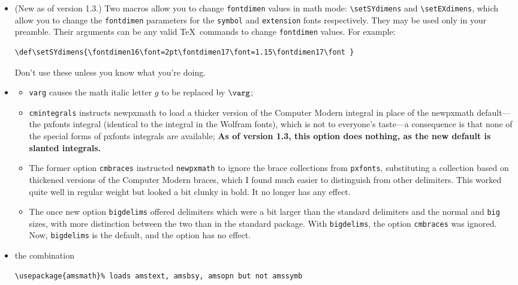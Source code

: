 \documentclass[11pt]{article}
\theoremstyle{oldplain}
\theoremstyle{plain}
\begin{document}
\begin{itemize}
\[\sum \Sumop \textstyle{\sum} \smallsum\]
Similarly, there are \verb|\smallprod| and \verb|\smallcoprod| which, along with \verb|\smallsum|, are of class {\tt mathop}, unlike their Greek letter equivalents.
\item (New as of version 1.3.) Two macros allow you to change {\tt fontdimen} values in math mode: \verb|\setSYdimens| and \verb|\setEXdimens|, which allow you to change the {\tt fontdimen} parameters for the {\tt symbol} and {\tt extension} fonts respectively. They may be used only in your preamble. Their arguments can be any valid \TeX\ commands to change {\tt fontdimen} values. For example:
\begin{verbatim}
\def\setSYdimens{\fontdimen16\font=2pt\fontdimen17\font=1.15\fontdimen17\font }
\end{verbatim}
Don't use these unless you know what you're doing.
\item 
\begin{itemize}
\item{\tt varg} causes the math italic letter $g$ to be replaced by $\varg$;
\item{\tt cmintegrals} instructs \textsf{newpxmath} to load a thicker version of the Computer Modern integral in place of the \textsf{newpxmath} default---the pxfonts integral (identical to the integral in the Wolfram fonts), which is not to everyone's taste---a consequence is that none of the special forms of \textsf{pxfonts} integrals are available; \textbf{As of version 1.3, this option does nothing, as the new default is slanted integrals.}
\item The former option {\tt cmbraces} instructed {\tt newpxmath} to ignore the brace collections from {\tt pxfonts}, substituting a collection based on thickened versions of the Computer Modern braces, which I found much easier to distinguish from other delimiters. This worked quite well in regular weight but looked a bit clunky in bold. It no longer has any effect.
\item The once new option {\tt bigdelims} offered delimiters which were a bit larger than the standard delimiters and the normal and {\tt big} sizes, with more distinction between the two than in the standard package. With {\tt bigdelims}, the option {\tt cmbraces} was ignored. Now, {\tt bigdelims} is the default, and the option has no effect.
\end{itemize}
\item the combination
\begin{verbatim}
\usepackage{amsmath}% loads amstext, amsbsy, amsopn but not amssymb

\end{verbatim}
\end{itemize}
\end{document}
